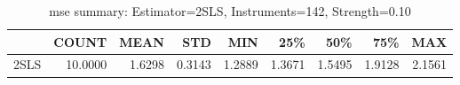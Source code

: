 \begin{table}[ht]
\centering
\caption{mse summary: Estimator=2SLS, Instruments=142, Strength=0.10}
\begin{tabular}{lrrrrrrrr}
\toprule
 & COUNT & MEAN & STD & MIN & 25\% & 50\% & 75\% & MAX \\
\midrule
2SLS & 10.0000 & 1.6298 & 0.3143 & 1.2889 & 1.3671 & 1.5495 & 1.9128 & 2.1561 \\
\bottomrule
\end{tabular}
\end{table}
